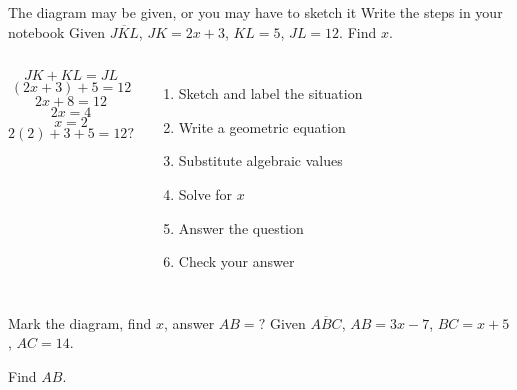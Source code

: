 \begin{frame}{The diagram may be given, or you may have to sketch it}
  {Write the steps in your notebook}
  Given $\overline{JKL}$, $JK=2x+3$, $KL=5$, $JL=12$. Find ${x}$.
  \begin{center}
  \end{center}
  \begin{columns}
      \[JK+KL=JL\]
      \[(2x+3)+5=12\]
      \[2x+8=12\]
      \[2x=4\]
      \[x=2\]
      \[2(2)+3+5=12?\]
      \begin{enumerate}
        \item Sketch and label the situation
        \item Write a geometric equation
        \item Substitute algebraic values
        \item Solve for $x$
        \item Answer the question
        \item \alert{Check} your answer
      \end{enumerate}
    \end{columns}
  \end{frame}

\begin{frame}{Mark the diagram, find $x$, answer $AB=?$}
  Given $\overline{ABC}$, $AB=3x-7$, $BC=x+5$, $AC=14$. \vspace{1cm}
  \begin{center}
  \end{center} 
  Find ${AB}$.\vspace{3cm}
  \end{frame}

